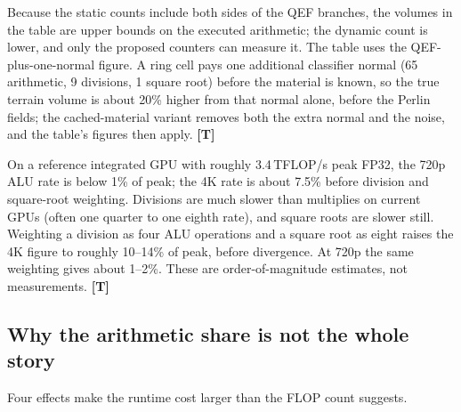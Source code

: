 \documentclass[11pt,a4paper]{article}
\newcommand{\evT}{\textsf{\textbf{\color{evT}[T]}}}
\newcommand{\code}[1]{\texttt{\detokenize{#1}}}
\theoremstyle{plain}
\theoremstyle{definition}
\theoremstyle{remark}
\begin{document}
Because the static counts include both sides of the QEF branches, the volumes
in the table are upper bounds on the executed arithmetic; the dynamic count is
lower, and only the proposed counters can measure it. The table uses the
QEF-plus-one-normal figure. A \code{LAND} ring cell pays
one additional classifier normal (65 arithmetic, 9 divisions, 1 square root)
before the material is known, so the true terrain volume is about 20\% higher
from that normal alone, before the Perlin fields; the cached-material variant
removes both the extra normal and the noise, and the table's figures then
apply. \evT

On a reference integrated GPU with roughly 3.4\,TFLOP/s peak FP32, the 720p
ALU rate is below 1\% of peak; the 4K rate is about 7.5\% before division and
square-root weighting. Divisions are much slower than multiplies on current
GPUs (often one quarter to one eighth rate), and square roots are slower
still. Weighting a division as four ALU operations and a square root as eight
raises the 4K figure to roughly 10--14\% of peak, before divergence. At 720p
the same weighting gives about 1--2\%. These are order-of-magnitude estimates,
not measurements. \evT

\subsection{Why the arithmetic share is not the whole story}

Four effects make the runtime cost larger than the FLOP count suggests.
\end{document}
